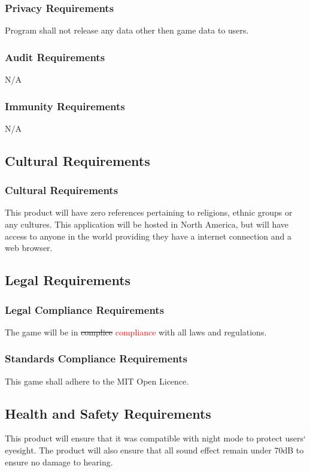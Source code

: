 \documentclass[12pt, titlepage]{article}
\begin{document}
\subsubsection{Privacy Requirements}
Program shall not release any data other then game data to users.
\subsubsection{Audit Requirements}
N/A
\subsubsection{Immunity Requirements}
N/A


\subsection{Cultural Requirements}
\subsubsection{Cultural Requirements}
This product will have zero references pertaining to religions, ethnic groups or any cultures. This application will be hosted in North America, but will have access to anyone in the world providing they have a internet connection and a web browser.

\subsection{Legal Requirements}
\subsubsection{Legal Compliance Requirements}
The game will be in \sout{complice} \textcolor{red}{compliance} with all laws and regulations.
\subsubsection{Standards Compliance Requirements}
This game shall adhere to the MIT Open Licence.

\subsection{Health and Safety Requirements}
This product will ensure that it was compatible with night mode to protect users` eyesight. The product will also ensure that all sound effect remain under 70dB to ensure no damage to hearing. 
\end{document}
